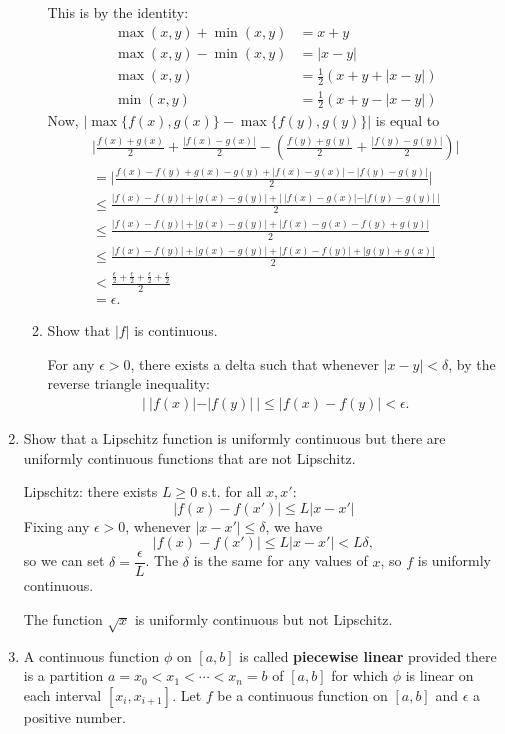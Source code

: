 \begin{enumerate}
\begin{enumerate}[label=(\roman*),align=left]
\[		\]
		This is by the identity:
		\begin{align*}
		\max(x,y)+\min(x,y)&=x+y\\
		\max(x,y)-\min(x,y)&=|x-y|\\
		\max(x,y)&=\frac{1}{2}(x+y+|x-y|)\\
		\min(x,y)&=\frac{1}{2}(x+y-|x-y|)
		\end{align*}
		Now, $|\max\{f(x),g(x)\}-\max\{f(y),g(y)\}|$ is equal to
		\begin{align*}
			\biggl | \frac{f(x)+g(x)}{2}+\frac{|f(x)-g(x)|}{2} - (\frac{f(y)+g(y)}{2}+\frac{|f(y)-g(y)|}{2}) \biggr | \\
			= \biggl | \frac{f(x)-f(y)+g(x)-g(y)+|f(x)-g(x)|-|f(y)-g(y)|}{2} \biggr |\\
			\le \frac{|f(x)-f(y)|+|g(x)-g(y)|+ |\ |f(x)-g(x)|-|f(y)-g(y)|\ |}{2} \\
			\le \frac{|f(x)-f(y)|+|g(x)-g(y)|+ |f(x)-g(x)-f(y)+g(y)|}{2} \\
			\le \frac{|f(x)-f(y)|+|g(x)-g(y)|+ |f(x)-f(y)|+|g(y)+g(x)|}{2} \\
			< \frac{\frac{\epsilon}{2}+\frac{\epsilon}{2}+ \frac{\epsilon}{2}+\frac{\epsilon}{2}}{2} \\
			=\epsilon.
		\end{align*}
        \item Show that $|f|$ is continuous.\par
        For any $\epsilon>0$, there exists a delta such that whenever $|x-y|<\delta$, by the reverse triangle inequality:
        \begin{align*}
			|\ |f(x)|-|f(y)|\ |\le|f(x)-f(y)| <\epsilon.
		\end{align*}
    \end{enumerate}
	\item Show that a Lipschitz function is uniformly continuous but there are uniformly continuous functions that are not Lipschitz.\par
	Lipschitz: there exists $L\ge0$ s.t. for all $x,x'$:
	\[
		|f(x)-f(x')|\le L|x-x'|
	\]
	Fixing any $\epsilon>0$, whenever $|x-x'|\le\delta$, we have
	\[
		|f(x)-f(x')|\le L|x-x'|<L\delta,
	\]
	so we can set $\delta=\dfrac{\epsilon}{L}$.
	The $\delta$ is the same for any values of $x$, so $f$ is uniformly continuous.\par
	The function $\sqrt{x}$ is uniformly continuous but not Lipschitz.
	\item A continuous function $\phi$ on $[a,b]$ is called \textbf{piecewise linear} provided there is a partition $a=x_0<x_1< \cdots <x_n = b$ of $[a,b]$ for which $\phi$ is linear on each interval $[x_i, x_{i+1}]$. Let $f$ be a continuous function on $[a,b]$ and $\epsilon$ a positive number. 

\end{enumerate}
